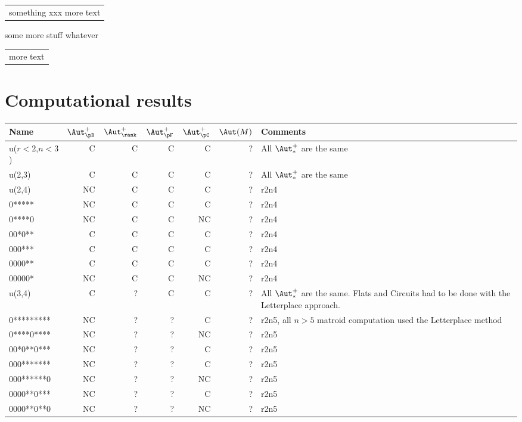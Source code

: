 
\begin{tabular}{}
something xxx
\hline
more text
\end{tabular}{}
some more stuff
whatever
\begin{tabular}{}
more text
\end{tabular}

\appendix
\section{Computational results}
\begin{center}
    \small
    \begin{tabular}{ | l | r | r | r | r | r |p{2.5cm} |}
    \hline
    Name  & $\Aut_{\pB}^+$ &  $\Aut_{\rank}^+$  & $\Aut_{\pF}^+$ & $\Aut_{\pC}^+$ & $\Aut(M)$ & Comments \\ \hline
     u($r<2$,$n<3$) &  C & C & C & C & ? &All $\Aut_{*}^+$ are the same  \\ \hline
    u(2,3) &  C & C & C & C &  ? &All $\Aut_{*}^+$ are the same  \\ \hline
    u(2,4) &  NC &  C & C & C &  ? & r2n4 \\ \hline
    0***** &  NC &  C & C & C &  ? & r2n4 \\ \hline
    0****0 &  NC &  C & C & NC & ? & r2n4 \\ \hline
    00*0** & C &  C & C & C & ? & r2n4  \\ \hline
    000*** & C &  C & C & C &  ? &r2n4  \\ \hline
    0000** & C &  C & C & C & ? & r2n4 \\ \hline
    00000* & NC &  C & C & NC &  ? &r2n4 \\ \hline
    u(3,4) &  C &  ? & C & C &   ? &All $\Aut_{*}^+$ are the same. Flats and Circuits had to be done with the Letterplace approach. \\ \hline
     0********* & NC &  ? & ? & C & ? & r2n5, all $n>5$ matroid computation used the Letterplace method \\ \hline
     0****0**** & NC &  ? & ? & NC &  ? &r2n5 \\ \hline
     00*0**0*** & NC &  ? & ? & C &  ? &r2n5 \\ \hline
     000******* & NC &  ? & ? & C & ? & r2n5 \\ \hline
     000******0 & NC &  ? & ? & NC & ? & r2n5 \\ \hline
     0000**0*** & NC &  ? & ? & C & ? & r2n5 \\ \hline
     0000**0**0 & NC &  ? & ? & NC & ? & r2n5 \\ \hline

\end{tabular}
\end{center}
